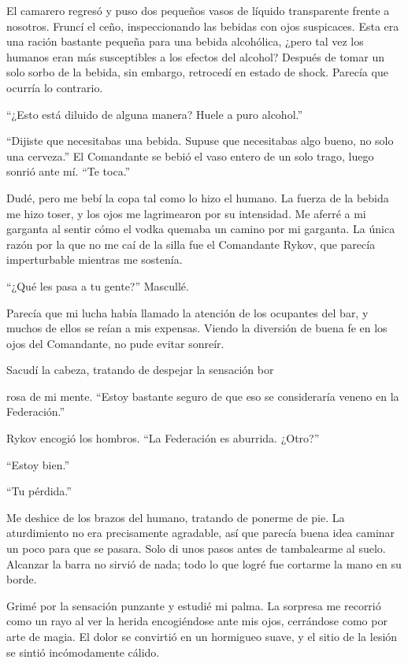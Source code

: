 \documentclass[spanish,12pt,a4paper,oneside,titlepage]{book}
\begin{document}
    El camarero regresó y puso dos pequeños vasos de líquido transparente frente a nosotros. Fruncí el ceño, inspeccionando las bebidas con ojos suspicaces. Esta era una ración bastante pequeña para una bebida alcohólica, ¿pero tal vez los humanos eran más susceptibles a los efectos del alcohol? Después de tomar un solo sorbo de la bebida, sin embargo, retrocedí en estado de shock. Parecía que ocurría lo contrario.

    ``¿Esto está diluido de alguna manera? Huele a puro alcohol.''

    ``Dijiste que necesitabas una bebida. Supuse que necesitabas algo bueno, no solo una cerveza.'' El Comandante se bebió el vaso entero de un solo trago, luego sonrió ante mí. ``Te toca.''

    Dudé, pero me bebí la copa tal como lo hizo el humano. La fuerza de la bebida me hizo toser, y los ojos me lagrimearon por su intensidad. Me aferré a mi garganta al sentir cómo el vodka quemaba un camino por mi garganta. La única razón por la que no me caí de la silla fue el Comandante Rykov, que parecía imperturbable mientras me sostenía.

    ``¿Qué les pasa a tu gente?'' Mascullé.

    Parecía que mi lucha había llamado la atención de los ocupantes del bar, y muchos de ellos se reían a mis expensas. Viendo la diversión de buena fe en los ojos del Comandante, no pude evitar sonreír.

    Sacudí la cabeza, tratando de despejar la sensación bor

    rosa de mi mente. ``Estoy bastante seguro de que eso se consideraría veneno en la Federación.''

    Rykov encogió los hombros. ``La Federación es aburrida. ¿Otro?''

    ``Estoy bien.''

    ``Tu pérdida.''

    Me deshice de los brazos del humano, tratando de ponerme de pie. La aturdimiento no era precisamente agradable, así que parecía buena idea caminar un poco para que se pasara. Solo di unos pasos antes de tambalearme al suelo. Alcanzar la barra no sirvió de nada; todo lo que logré fue cortarme la mano en su borde.

    Grimé por la sensación punzante y estudié mi palma. La sorpresa me recorrió como un rayo al ver la herida encogiéndose ante mis ojos, cerrándose como por arte de magia. El dolor se convirtió en un hormigueo suave, y el sitio de la lesión se sintió incómodamente cálido.
\end{document}
